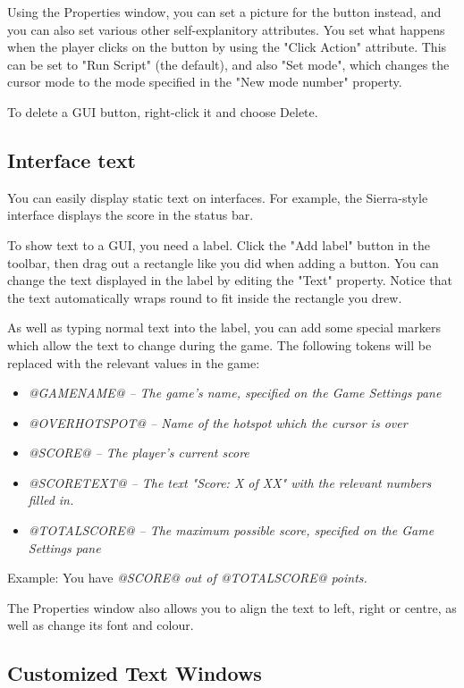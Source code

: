 Using the Properties window, you can set a picture for the button instead,
and you can also set various other self-explanitory attributes.
You set what happens when the player clicks on the button by using the "Click
Action" attribute. This can be set to "Run Script" (the default), and also "Set
mode", which changes the cursor mode to the mode specified in the "New mode number"
property.

To delete a GUI button, right-click it and choose Delete.

\subsection{Interface text}%

You can easily display static text on interfaces. For example, the Sierra-style
interface displays the score in the status bar.

To show text to a GUI, you need a label. Click the "Add label" button in the
toolbar, then drag out a rectangle like you did when adding a button. You can change the
text displayed in the label by editing the "Text" property. Notice that the
text automatically wraps round to fit inside the rectangle you drew.

As well as typing normal text into the label, you can add some special markers
which allow the text to change during the game. The following tokens will be
replaced with the relevant values in the game:
\begin{itemize}
\item \it{@GAMENAME@} -- The game's name, specified on the Game Settings pane
\item \it{@OVERHOTSPOT@} -- Name of the hotspot which the cursor is over
\item \it{@SCORE@} -- The player's current score
\item \it{@SCORETEXT@} --  The text "Score: X of XX" with the relevant numbers filled in.
\item \it{@TOTALSCORE@} -- The maximum possible score, specified on the Game Settings pane
\end{itemize}
Example: You have \it{@SCORE@} out of \it{@TOTALSCORE@} points.

The Properties window also allows you to align the text to left, right or
centre, as well as change its font and colour.

\subsection{Customized Text Windows}\label{TextWin}%

